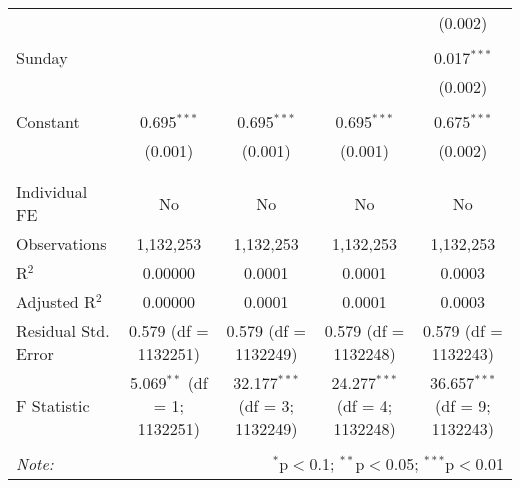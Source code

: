 \documentclass[
]{article}
\begin{document}
\begin{table}[!htbp]
{\begin{tabular}{@{\extracolsep{5pt}}lcccc}
  &  &  &  & (0.002) \\ 
  & & & & \\ 
 Sunday &  &  &  & 0.017$^{***}$ \\ 
  &  &  &  & (0.002) \\ 
  & & & & \\ 
 Constant & 0.695$^{***}$ & 0.695$^{***}$ & 0.695$^{***}$ & 0.675$^{***}$ \\ 
  & (0.001) & (0.001) & (0.001) & (0.002) \\ 
  & & & & \\ 
\hline \\[-1.8ex] 
Individual FE & No & No & No & No \\ 
Observations & 1,132,253 & 1,132,253 & 1,132,253 & 1,132,253 \\ 
R$^{2}$ & 0.00000 & 0.0001 & 0.0001 & 0.0003 \\ 
Adjusted R$^{2}$ & 0.00000 & 0.0001 & 0.0001 & 0.0003 \\ 
Residual Std. Error & 0.579 (df = 1132251) & 0.579 (df = 1132249) & 0.579 (df = 1132248) & 0.579 (df = 1132243) \\ 
F Statistic & 5.069$^{**}$ (df = 1; 1132251) & 32.177$^{***}$ (df = 3; 1132249) & 24.277$^{***}$ (df = 4; 1132248) & 36.657$^{***}$ (df = 9; 1132243) \\ 
\hline 
\hline \\[-1.8ex] 
\textit{Note:}  & \multicolumn{4}{r}{$^{*}$p$<$0.1; $^{**}$p$<$0.05; $^{***}$p$<$0.01} \\ 
\end{tabular}
} 
\end{table} 
\newpage
\end{document}
